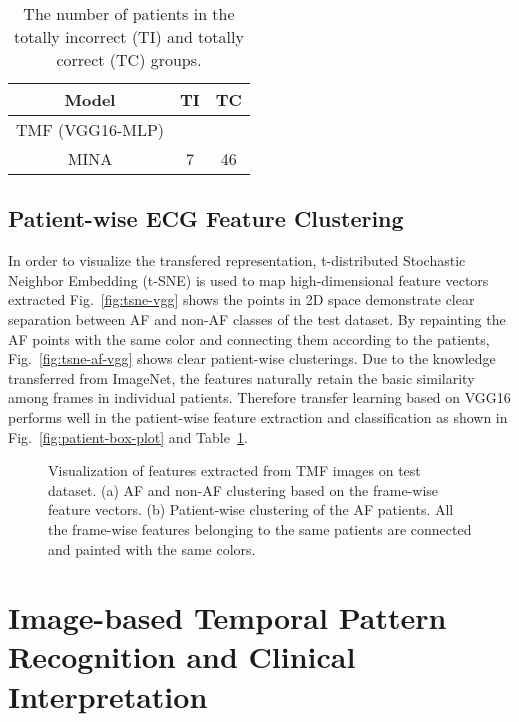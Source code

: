 \documentclass[journal]{IEEEtran}
\begin{document}
\begin{table}[H]
  \caption{The number of patients in the totally incorrect (TI) and totally correct (TC) groups.}
  \centering
  \begin{tabular}{ccc}
  \hline
  Model     &   TI & TC\\
  \hline
  TMF (VGG16-MLP) &   &   \\
  MINA        &  7 &   46\\
  \hline
  \end{tabular}
  \label{tab:result-patient-classifier}
\end{table}



\subsection{Patient-wise ECG Feature Clustering}\label{clustering}
In order to visualize the transfered representation, t-distributed Stochastic Neighbor Embedding (t-SNE) \cite{tsne_2008} is used to map high-dimensional feature vectors  extracted 
Fig.~\ref{fig:tsne-vgg} shows the points in 2D space demonstrate clear separation between AF and non-AF classes of the test dataset. By repainting the AF points with the same color and connecting them according to the patients, Fig.~\ref{fig:tsne-af-vgg} shows clear patient-wise clusterings. Due to the knowledge transferred from ImageNet, the features naturally retain the basic similarity among frames in individual patients. 
Therefore transfer learning based on VGG16 performs well in the patient-wise feature extraction and classification as shown in Fig.~\ref{fig:patient-box-plot} and Table~\ref{tab:result-patient-classifier}.

\begin{figure*}[th]
  \centering
  \caption{Visualization of features extracted from TMF images on test dataset. (a) AF and non-AF clustering based on the frame-wise feature vectors. (b) Patient-wise clustering of the AF patients. All the frame-wise features belonging to the same patients are connected and painted  with the same colors.} \label{fig:tsne}
\end{figure*}


\section{Image-based Temporal Pattern Recognition and Clinical Interpretation}
\label{sec:interpret}
\end{document}
